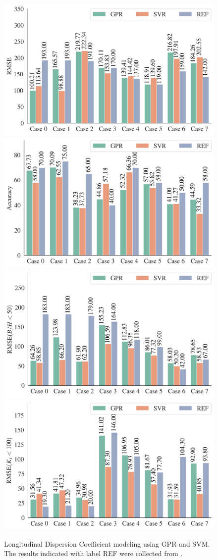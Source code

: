 \documentclass[a4paper,12pt, english]{article}
\begin{document}
\begin{figure}[!]
 \centering
 \includegraphics[width=0.495\linewidth]{./results/eml____300dpi_comparison_datasets_metric_rmse_bar}
 \includegraphics[width=0.495\linewidth]{./results/eml____300dpi_comparison_datasets_metric_accuracy_bar}
 \includegraphics[width=0.495\linewidth]{./results/eml____300dpi_comparison_datasets_metric_rmsebh_50_bar}
 \includegraphics[width=0.495\linewidth]{./results/eml____300dpi_comparison_datasets_metric_rmsek_x_100_bar}
 \caption{
 \label{fig:eml____300dpi_comparison_datasets_metric}
 Longitudinal Dispersion Coefficient modeling using GPR and SVM.
 The results indicated with label REF were collected from \cite{tayfur2005predicting}. 
 }
\end{figure}
\end{document}
